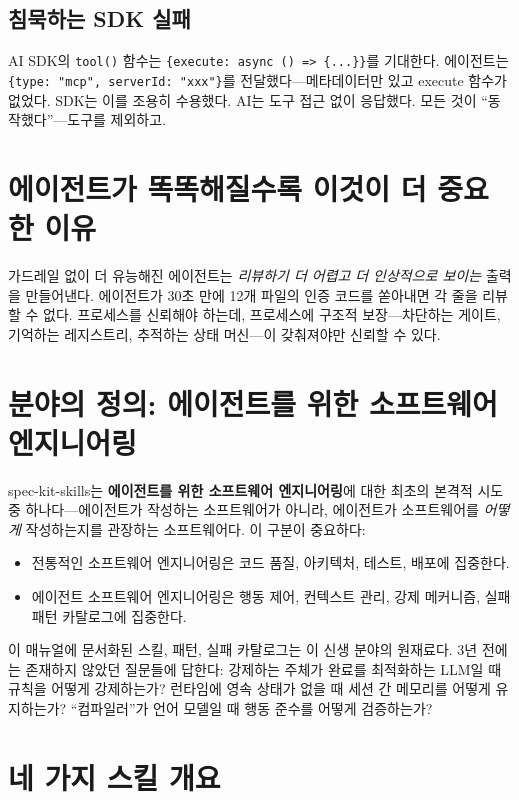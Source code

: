 \documentclass[11pt,a4paper,openright,twoside]{report}
\begin{document}
\subsection{침묵하는 SDK 실패}

AI SDK의 \texttt{tool()} 함수는 \texttt{\{execute: async () => \{...\}\}}를 기대한다. 에이전트는 \texttt{\{type: "mcp", serverId: "xxx"\}}를 전달했다---메타데이터만 있고 execute 함수가 없었다. SDK는 이를 조용히 수용했다. AI는 도구 접근 없이 응답했다. 모든 것이 ``동작했다''---도구를 제외하고.

\section{에이전트가 똑똑해질수록 이것이 더 중요한 이유}

가드레일 없이 더 유능해진 에이전트는 \emph{리뷰하기 더 어렵고} \emph{더 인상적으로 보이는} 출력을 만들어낸다. 에이전트가 30초 만에 12개 파일의 인증 코드를 쏟아내면 각 줄을 리뷰할 수 없다. 프로세스를 신뢰해야 하는데, 프로세스에 구조적 보장---차단하는 게이트, 기억하는 레지스트리, 추적하는 상태 머신---이 갖춰져야만 신뢰할 수 있다.

\section{분야의 정의: 에이전트를 위한 소프트웨어 엔지니어링}

spec-kit-skills는 \textbf{에이전트를 위한 소프트웨어 엔지니어링}에 대한 최초의 본격적 시도 중 하나다---에이전트가 작성하는 소프트웨어가 아니라, 에이전트가 소프트웨어를 \emph{어떻게} 작성하는지를 관장하는 소프트웨어다. 이 구분이 중요하다:

\begin{itemize}
  \item 전통적인 소프트웨어 엔지니어링은 코드 품질, 아키텍처, 테스트, 배포에 집중한다.
  \item 에이전트 소프트웨어 엔지니어링은 행동 제어, 컨텍스트 관리, 강제 메커니즘, 실패 패턴 카탈로그에 집중한다.
\end{itemize}

이 매뉴얼에 문서화된 스킬, 패턴, 실패 카탈로그는 이 신생 분야의 원재료다. 3년 전에는 존재하지 않았던 질문들에 답한다: 강제하는 주체가 완료를 최적화하는 LLM일 때 규칙을 어떻게 강제하는가? 런타임에 영속 상태가 없을 때 세션 간 메모리를 어떻게 유지하는가? ``컴파일러''가 언어 모델일 때 행동 준수를 어떻게 검증하는가?


\section{네 가지 스킬 개요}
\end{document}
